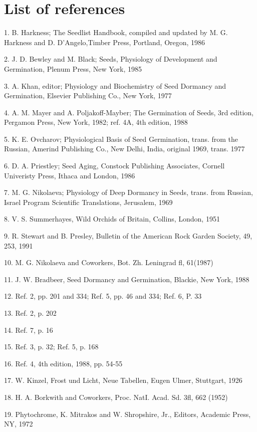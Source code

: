 \chapter{List of references}

1. B. Harkness; The Seedlist Handbook, compiled and updated by M. G. Harkness
and D. D'Angelo,Timber Press, Portland, Oregon, 1986

2. J. D. Bewley and M. Black; Seeds, Physiology of Development and Germination,
Plenum Press, New York, 1985

3. A. Khan, editor; Physiology and Biochemistry of Seed Dormancy and
Germination, Elsevier Publishing Co., New York, 1977

4. A. M. Mayer and A. Poljakoff-Mayber; The Germination of Seeds, 3rd edition,
Pergamon Press, New York, 1982; ref. 4A, 4th edition, 1988

5. K. E. Ovcharov; Physiological Basis of Seed Germination, trans. from the
Russian, Amerind Publishing Co., New Delhi, India, original 1969, trans. 1977

6. D. A. Priestley; Seed Aging, Constock Publishing Associates, Cornell Univeristy
Press, Ithaca and London, 1986

7. M. G. Nikolaeva; Physiology of Deep Dormancy in Seeds, trans. from Russian,
Israel Program Scientific Translations, Jerusalem, 1969

8. V. S. Summerhayes, Wild Orchids of Britain, Collins, London, 1951

9. R. Stewart and B. Presley, Bulletin of the American Rock Garden Society, 49, 253,
1991

10. M. G. Nikolaeva and Coworkers, Bot. Zh. Leningrad fl, 61(1987)

11. J. W. Bradbeer, Seed Dormancy and Germination, Blackie, New York, 1988

12. Ref. 2, pp. 201 and 334; Ref. 5, pp. 46 and 334; Ref. 6, P. 33

13. Ref. 2, p. 202

14. Ref. 7, p. 16

15. Ref. 3, p. 32; Ref. 5, p. 168

16. Ref. 4, 4th edition, 1988, pp. 54-55

17. W. Kinzel, Frost und Licht, Neue Tabellen, Eugen Ulmer, Stuttgart, 1926

18. H. A. Borkwith and Coworkers, Proc. NatI. Acad. Sd. 3fl, 662 (1952)

19. Phytochrome, K. Mitrakos and W. Shropshire, Jr., Editors, Academic Press, NY,
1972

